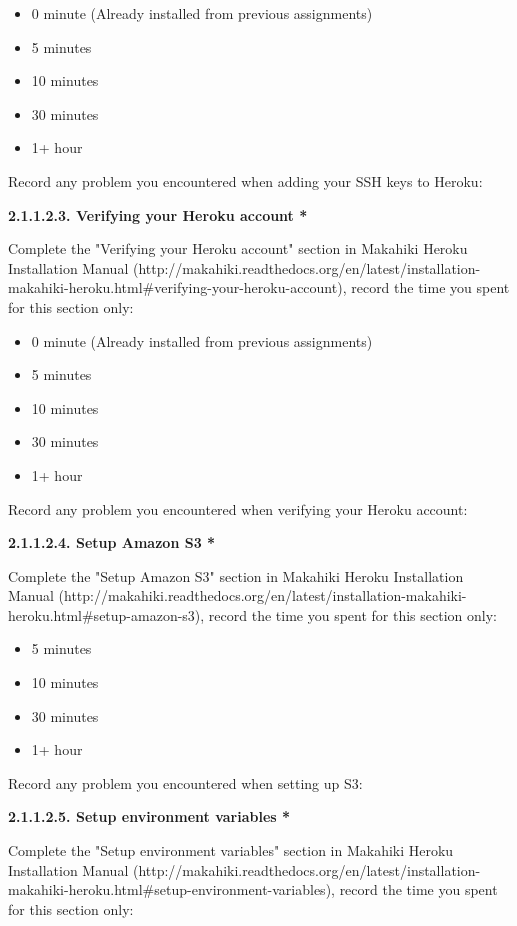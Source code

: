 \begin{itemize}
\item 0 minute (Already installed from previous assignments)
\item 5 minutes
\item  10 minutes
\item  30 minutes
\item  1+ hour
\end{itemize}

Record any problem you encountered when adding your SSH keys to Heroku:

{\bf 2.1.1.2.3. Verifying your Heroku account *}

Complete the "Verifying your Heroku account" section in Makahiki Heroku Installation Manual (http://makahiki.readthedocs.org/en/latest/installation-makahiki-heroku.html\#verifying-your-heroku-account), record the time you spent for this section only:

\begin{itemize}
\item 0 minute (Already installed from previous assignments)
\item 5 minutes
\item  10 minutes
\item  30 minutes
\item  1+ hour
\end{itemize}

Record any problem you encountered when verifying your Heroku account:

{\bf 2.1.1.2.4. Setup Amazon S3 *}

Complete the "Setup Amazon S3" section in Makahiki Heroku Installation Manual (http://makahiki.readthedocs.org/en/latest/installation-makahiki-heroku.html\#setup-amazon-s3), record the time you spent for this section only:

\begin{itemize}
\item 5 minutes
\item  10 minutes
\item  30 minutes
\item  1+ hour
\end{itemize}

Record any problem you encountered when setting up S3:

{\bf 2.1.1.2.5. Setup environment variables *}

Complete the "Setup environment variables" section in Makahiki Heroku Installation Manual (http://makahiki.readthedocs.org/en/latest/installation-makahiki-heroku.html\#setup-environment-variables), record the time you spent for this section only:

